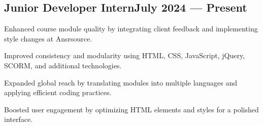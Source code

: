 \subsection{{Junior Developer Intern\hfill July 2024 --- Present}}
\begin{zitemize}
\item  Enhanced course module quality by integrating client feedback and implementing style changes at Ansrsource.
\item Improved consistency and modularity using HTML, CSS, JavaScript, jQuery, SCORM, and additional technologies. 
\item Expanded global reach by translating modules into multiple languages and applying efficient coding practices.
\item Boosted user engagement by optimizing HTML elements and styles for a polished interface. 
\end{zitemize}


